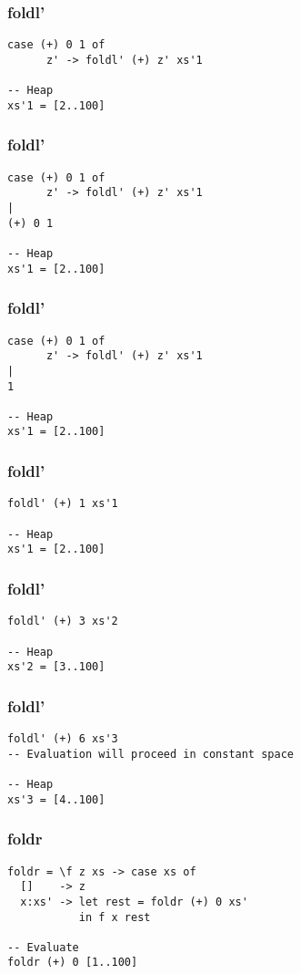 \documentclass{beamer}
\begin{document}
\begin{frame}[t,fragile]
\frametitle{foldl'}
\begin{verbatim}
case (+) 0 1 of
      z' -> foldl' (+) z' xs'1

-- Heap
xs'1 = [2..100]      
\end{verbatim}
\end{frame}

\begin{frame}[t,fragile]
\frametitle{foldl'}
\begin{verbatim}
case (+) 0 1 of
      z' -> foldl' (+) z' xs'1
|
(+) 0 1      

-- Heap
xs'1 = [2..100]      
\end{verbatim}
\end{frame}

\begin{frame}[t,fragile]
\frametitle{foldl'}
\begin{verbatim}
case (+) 0 1 of
      z' -> foldl' (+) z' xs'1
|
1

-- Heap
xs'1 = [2..100]      
\end{verbatim}
\end{frame}

\begin{frame}[t,fragile]
\frametitle{foldl'}
\begin{verbatim}
foldl' (+) 1 xs'1

-- Heap
xs'1 = [2..100]      
\end{verbatim}
\end{frame}

\begin{frame}[t,fragile]
\frametitle{foldl'}
\begin{verbatim}
foldl' (+) 3 xs'2

-- Heap
xs'2 = [3..100]      
\end{verbatim}
\end{frame}

\begin{frame}[t,fragile]
\frametitle{foldl'}
\begin{verbatim}
foldl' (+) 6 xs'3
-- Evaluation will proceed in constant space

-- Heap
xs'3 = [4..100]      
\end{verbatim}
\end{frame}

\begin{frame}[t,fragile]
\frametitle{foldr}
\begin{verbatim}
foldr = \f z xs -> case xs of
  []    -> z
  x:xs' -> let rest = foldr (+) 0 xs'
           in f x rest

-- Evaluate
foldr (+) 0 [1..100]  
\end{verbatim}
\end{frame}
\end{document}
